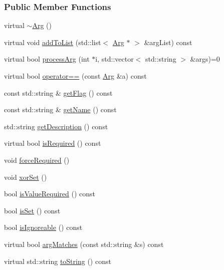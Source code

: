 \subsubsection*{Public Member Functions}
\begin{DoxyCompactItemize}
\item 
virtual \hyperlink{classTCLAP_1_1Arg_a15734a7cf52c8c4ab6df70f0997bbee3}{$\sim$\+Arg} ()
\item 
virtual void \hyperlink{classTCLAP_1_1Arg_a9ff1564beeea2ef855f7fa483c37d0e2}{add\+To\+List} (std\+::list$<$ \hyperlink{classTCLAP_1_1Arg}{Arg} $\ast$ $>$ \&arg\+List) const 
\item 
virtual bool \hyperlink{classTCLAP_1_1Arg_a61ffe2f660a76111d256f7b22a686146}{process\+Arg} (int $\ast$i, std\+::vector$<$ std\+::string $>$ \&args)=0
\item 
virtual bool \hyperlink{classTCLAP_1_1Arg_a657a8d2842b7de9ced5a5a55db01d367}{operator==} (const \hyperlink{classTCLAP_1_1Arg}{Arg} \&a) const 
\item 
const std\+::string \& \hyperlink{classTCLAP_1_1Arg_a22f616e81a423e794f13a9ae1549ac77}{get\+Flag} () const 
\item 
const std\+::string \& \hyperlink{classTCLAP_1_1Arg_a641ced141a56c74fee11d3e3a808f731}{get\+Name} () const 
\item 
std\+::string \hyperlink{classTCLAP_1_1Arg_a1943999fadcb4f28cecd6ba55ed0b085}{get\+Description} () const 
\item 
virtual bool \hyperlink{classTCLAP_1_1Arg_a00a3cfdb2b6e9a111ad39cbd4978b96c}{is\+Required} () const 
\item 
void \hyperlink{classTCLAP_1_1Arg_a58e3de560f364d0bb6bdf36ab533a6fd}{force\+Required} ()
\item 
void \hyperlink{classTCLAP_1_1Arg_aec525c8092e56f7f5aa455e71bc72374}{xor\+Set} ()
\item 
bool \hyperlink{classTCLAP_1_1Arg_a1373d50d4b93c16db43c7600cf6d0355}{is\+Value\+Required} () const 
\item 
bool \hyperlink{classTCLAP_1_1Arg_a6af7a1e92b5d92fc2d90c1a95aab4384}{is\+Set} () const 
\item 
bool \hyperlink{classTCLAP_1_1Arg_a33816b5ccc58a15f3a998480e5d988e2}{is\+Ignoreable} () const 
\item 
virtual bool \hyperlink{classTCLAP_1_1Arg_aac37b1b734b477e5d16f2037dba9c125}{arg\+Matches} (const std\+::string \&s) const 
\item 
virtual std\+::string \hyperlink{classTCLAP_1_1Arg_ac98a357568c21f0eb6ca2220b8a3d4a2}{to\+String} () const 

\end{DoxyCompactItemize}
